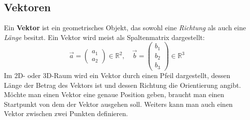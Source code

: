 \pagebreak
\subsection{Vektoren}
Ein \textbf{Vektor} ist ein geometrisches Objekt, das sowohl eine \textit{Richtung} als auch eine \textit{Länge} besitzt. Ein Vektor wird meist als Spaltenmatrix dargestellt:
\begin{equation}
\vec{a} = 
\begin{pmatrix}
a_1 \\ a_2
\end{pmatrix} \in \mathbb{R}^2, \quad
\vec{b} = 
\begin{pmatrix}
b_1 \\ b_2 \\ b_3
\end{pmatrix} \in \mathbb{R}^3
\end{equation}
\noindent
Im 2D- oder 3D-Raum wird ein Vektor durch einen Pfeil dargestellt, dessen Länge der Betrag des Vektors ist und dessen Richtung die Orientierung angibt.
Möchte man einen Vektor eine genaue Position geben, braucht man einen Startpunkt von dem der Vektor ausgehen soll. Weiters kann man auch einen Vektor zwischen zwei Punkten definieren.

\begin{center}
\end{center}

